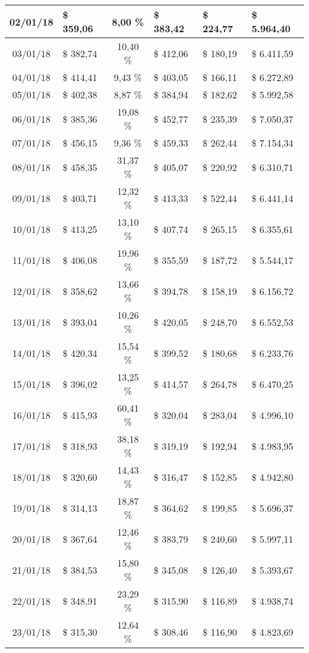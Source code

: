\begin{center}
\begin{small}
\begin{longtable}{|c|l|c|l|l|l|}
02/01/18 & \$ 359,06 & 8,00 \% & \$ 383,42 & \$ 224,77 & \$ 5.964,40 \\ \hline
03/01/18 & \$ 382,74 & 10,40 \% & \$ 412,06 & \$ 180,19 & \$ 6.411,59 \\ \hline
04/01/18 & \$ 414,41 & 9,43 \% & \$ 403,05 & \$ 166,11 & \$ 6.272,89 \\ \hline
05/01/18 & \$ 402,38 & 8,87 \% & \$ 384,94 & \$ 182,62 & \$ 5.992,58 \\ \hline
06/01/18 & \$ 385,36 & 19,08 \% & \$ 452,77 & \$ 235,39 & \$ 7.050,37 \\ \hline
07/01/18 & \$ 456,15 & 9,36 \% & \$ 459,33 & \$ 262,44 & \$ 7.154,34 \\ \hline
08/01/18 & \$ 458,35 & 31,37 \% & \$ 405,07 & \$ 220,92 & \$ 6.310,71 \\ \hline
09/01/18 & \$ 403,71 & 12,32 \% & \$ 413,33 & \$ 522,44 & \$ 6.441,14 \\ \hline
10/01/18 & \$ 413,25 & 13,10 \% & \$ 407,74 & \$ 265,15 & \$ 6.355,61 \\ \hline
11/01/18 & \$ 406,08 & 19,96 \% & \$ 355,59 & \$ 187,72 & \$ 5.544,17 \\ \hline
12/01/18 & \$ 358,62 & 13,66 \% & \$ 394,78 & \$ 158,19 & \$ 6.156,72 \\ \hline
13/01/18 & \$ 393,04 & 10,26 \% & \$ 420,05 & \$ 248,70 & \$ 6.552,53 \\ \hline
14/01/18 & \$ 420,34 & 15,54 \% & \$ 399,52 & \$ 180,68 & \$ 6.233,76 \\ \hline
15/01/18 & \$ 396,02 & 13,25 \% & \$ 414,57 & \$ 264,78 & \$ 6.470,25 \\ \hline
16/01/18 & \$ 415,93 & 60,41 \% & \$ 320,04 & \$ 283,04 & \$ 4.996,10 \\ \hline
17/01/18 & \$ 318,93 & 38,18 \% & \$ 319,19 & \$ 192,94 & \$ 4.983,95 \\ \hline
18/01/18 & \$ 320,60 & 14,43 \% & \$ 316,47 & \$ 152,85 & \$ 4.942,80 \\ \hline
19/01/18 & \$ 314,13 & 18,87 \% & \$ 364,62 & \$ 199,85 & \$ 5.696,37 \\ \hline
20/01/18 & \$ 367,64 & 12,46 \% & \$ 383,79 & \$ 240,60 & \$ 5.997,11 \\ \hline
21/01/18 & \$ 384,53 & 15,80 \% & \$ 345,08 & \$ 126,40 & \$ 5.393,67 \\ \hline
22/01/18 & \$ 348,91 & 23,29 \% & \$ 315,90 & \$ 116,89 & \$ 4.938,74 \\ \hline
23/01/18 & \$ 315,30 & 12,64 \% & \$ 308,46 & \$ 116,90 & \$ 4.823,69 \\ \hline

\end{longtable}
\end{small}
\end{center}
